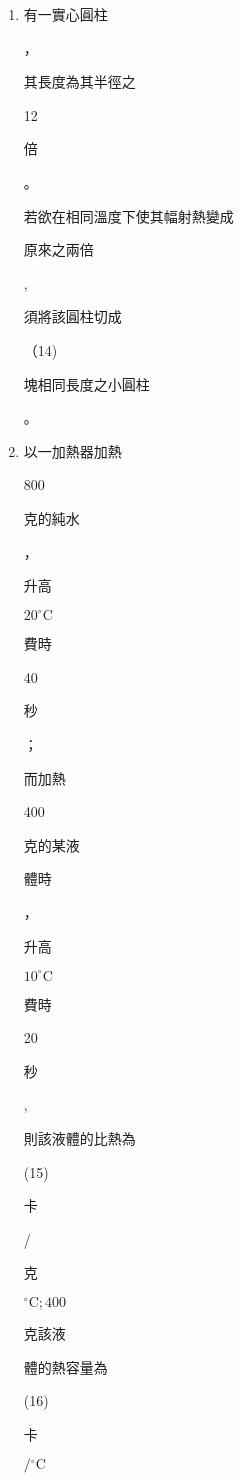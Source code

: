 \documentclass[10pt]{article}
\begin{document}
\begin{enumerate}
  \item \begin{CJK}{UTF8}{mj}有一實心圓柱\end{CJK}，\begin{CJK}{UTF8}{mj}其長度為其半徑之\end{CJK} 12 \begin{CJK}{UTF8}{mj}倍\end{CJK}。\begin{CJK}{UTF8}{mj}若欲在相同溫度下使其幅射熱變成\end{CJK} \begin{CJK}{UTF8}{mj}原來之兩倍\end{CJK} , \begin{CJK}{UTF8}{mj}須將該圓柱切成\end{CJK}（14) \begin{CJK}{UTF8}{mj}塊相同長度之小圓柱\end{CJK}。

  \item \begin{CJK}{UTF8}{mj}以一加熱器加熱\end{CJK} 800 \begin{CJK}{UTF8}{mj}克的純水\end{CJK}，\begin{CJK}{UTF8}{mj}升高\end{CJK} $20^{\circ} \mathrm{C}$ \begin{CJK}{UTF8}{mj}費時\end{CJK} 40 \begin{CJK}{UTF8}{mj}秒\end{CJK}；\begin{CJK}{UTF8}{mj}而加熱\end{CJK} 400 \begin{CJK}{UTF8}{mj}克的某液\end{CJK} \begin{CJK}{UTF8}{mj}體時\end{CJK}，\begin{CJK}{UTF8}{mj}升高\end{CJK} $10^{\circ} \mathrm{C}$ \begin{CJK}{UTF8}{mj}費時\end{CJK} 20 \begin{CJK}{UTF8}{mj}秒\end{CJK}, \begin{CJK}{UTF8}{mj}則該液體的比熱為\end{CJK}(15) \begin{CJK}{UTF8}{mj}卡\end{CJK}/\begin{CJK}{UTF8}{mj}克\end{CJK} ${ }^{\circ} \mathrm{C} ; 400$ \begin{CJK}{UTF8}{mj}克該液\end{CJK} \begin{CJK}{UTF8}{mj}體的熱容量為\end{CJK} (16) \begin{CJK}{UTF8}{mj}卡\end{CJK} $/{ }^{\circ} \mathrm{C}$


\end{enumerate}
\end{document}
